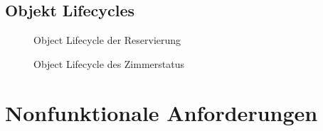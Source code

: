 \documentclass[a4paper,12pt,twoside]{scrreprt}
\begin{document}
    \newpage
    \section{Objekt Lifecycles}
    \begin{figure}[ht!]
        \begin{center}
            \caption{Object Lifecycle der Reservierung}\label{objectlifecycleReservierung}
        \end{center}
    \end{figure}

    \begin{figure}[ht!]
        \begin{center}
            \caption{Object Lifecycle des Zimmerstatus}\label{objectlifecycleZimmerstatus}
        \end{center}
    \end{figure}

    \chapter{Nonfunktionale Anforderungen  }
\end{document}
